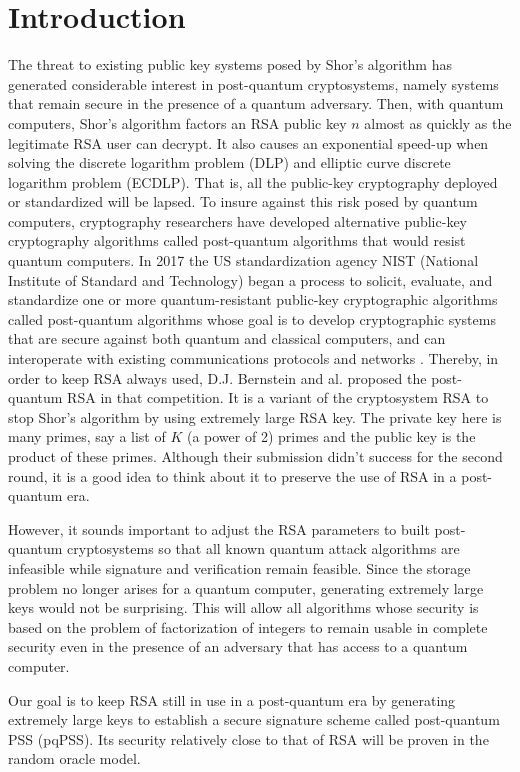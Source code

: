 \documentclass[a4paper,11pt]{article}
\begin{document}
\section{Introduction}
The threat to existing public key systems posed by Shor's algorithm \cite{Shor} has generated considerable interest in post-quantum cryptosystems, namely systems that remain secure in the presence of a quantum adversary. Then, with quantum computers, Shor's algorithm factors an RSA public key $n$ almost as quickly as the legitimate RSA user can decrypt. It also causes an exponential speed-up when solving the discrete logarithm problem (DLP) and elliptic curve discrete logarithm problem (ECDLP). That is, all the public-key cryptography deployed or standardized will be lapsed. To insure against this risk posed by quantum computers, cryptography
researchers have developed alternative public-key cryptography algorithms called
post-quantum algorithms that would resist quantum computers. In 2017 the US standardization
agency NIST (National Institute of Standard and Technology) began a process to solicit, evaluate, and standardize one or more quantum-resistant public-key cryptographic algorithms called post-quantum algorithms whose goal is to develop cryptographic systems that are secure against both quantum and classical computers, and can interoperate with existing communications protocols and networks \cite{Nist} . Thereby, in order to keep RSA always used, D.J. Bernstein and al. proposed the post-quantum RSA \cite{pqRSA} in that competition. It is a variant of the cryptosystem RSA to stop Shor's algorithm by using extremely large RSA key. The private key here is many primes, say a list of $K$ (a power of 2) primes and the public key is the product of these primes. Although their submission didn't success for the second round, it is a good idea to think about it to preserve the use of RSA in a post-quantum era.

However, it sounds important to adjust the RSA parameters to built post-quantum cryptosystems so that all known quantum attack algorithms are infeasible while signature and verification remain feasible. Since the storage problem no longer arises for a quantum computer, generating extremely large keys would not be surprising. This will allow all algorithms whose security is based on the problem of factorization of integers to remain usable in complete security even in the presence of an adversary that has access to a quantum computer.


Our goal is to keep RSA still in  use in a post-quantum era by generating extremely large keys to establish a secure signature scheme called post-quantum PSS (pqPSS). Its security relatively close to that of RSA will be proven in the random oracle model.%
\end{document}
